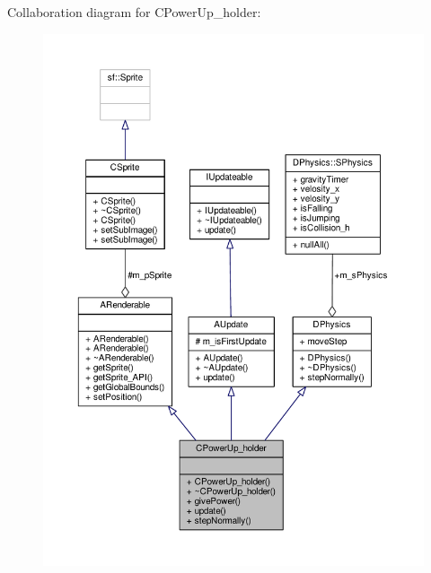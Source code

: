 Collaboration diagram for C\-Power\-Up\-\_\-holder\-:
\nopagebreak
\begin{figure}[H]
\begin{center}
\leavevmode
\includegraphics[width=350pt]{classCPowerUp__holder__coll__graph}
\end{center}
\end{figure}
